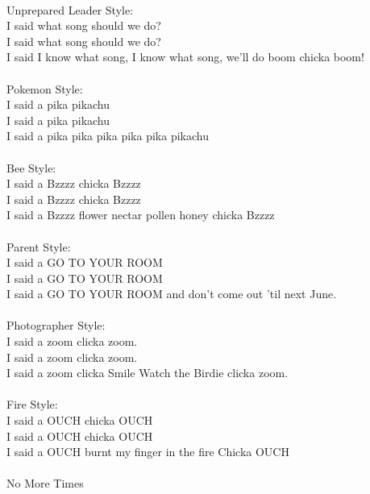 \\
Unprepared Leader Style:\\
I said what song should we do?\\
I said what song should we do?\\
I said I know what song, I know what song, we'll do boom chicka boom!\\
\\
Pokemon Style:\\
I said a pika pikachu\\
I said a pika pikachu\\
I said a pika pika pika pika pika pikachu\\
\\
Bee Style:\\
I said a Bzzzz chicka Bzzzz\\
I said a Bzzzz chicka Bzzzz\\
I said a Bzzzz flower nectar pollen honey chicka Bzzzz\\
\\
Parent Style:\\
I said a GO TO YOUR ROOM\\
I said a GO TO YOUR ROOM\\
I said a GO TO YOUR ROOM and don't come out 'til next June.\\
\\
Photographer Style:\\
I said a zoom clicka zoom.\\
I said a zoom clicka zoom.\\
I said a zoom clicka Smile Watch the Birdie clicka zoom.\\
\\
Fire Style:\\
I said a OUCH chicka OUCH\\
I said a OUCH chicka OUCH\\
I said a OUCH burnt my finger in the fire Chicka OUCH\\
\\
No More Times\\
